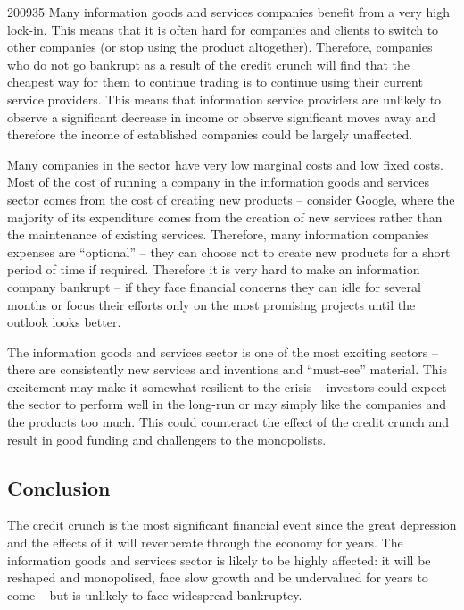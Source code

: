 \documentclass[a4paper]{article}
\begin{document}
\begin{examquestion}{2009}{3}{5}
Many information goods and services companies benefit from a very high
lock-in. This means that it is often hard for companies and clients to
switch to other companies (or stop using the product altogether). Therefore,
companies who do not go bankrupt as a result of the credit crunch will find
that the cheapest way for them to continue trading is to continue using their
current service providers. This means that information service providers are
unlikely to observe a significant decrease in income or observe significant
moves away and therefore the income of established companies could be largely
unaffected.

Many companies in the sector have very low marginal costs and low fixed
costs. Most of the cost of running a company in the information goods and
services sector comes from the cost of creating new products -- consider
Google, where the majority of its expenditure comes from the creation of new
services rather than the maintenance of existing services. Therefore, many
information companies expenses are ``optional'' -- they can choose not to
create new products for a short period of time if required. Therefore it is
very hard to make an information company bankrupt -- if they face financial
concerns they can idle for several months or focus their efforts only on
the most promising projects until the outlook looks better.

The information goods and services sector is one of the most exciting
sectors -- there are consistently new services and inventions and
``must-see'' material. This excitement may make it somewhat resilient to the
crisis -- investors could expect the sector to perform well in the long-run
or may simply like the companies and the products too much. This could
counteract the effect of the credit crunch and result in good funding and
challengers to the monopolists.

\subsection*{Conclusion}

The credit crunch is the most significant financial event since the great
depression and the effects of it will reverberate through the economy for
years. The information goods and services sector is likely to be highly
affected: it will be reshaped and monopolised, face slow growth and be
undervalued for years to come -- but is unlikely to face widespread bankruptcy.

\end{examquestion}
\end{document}
